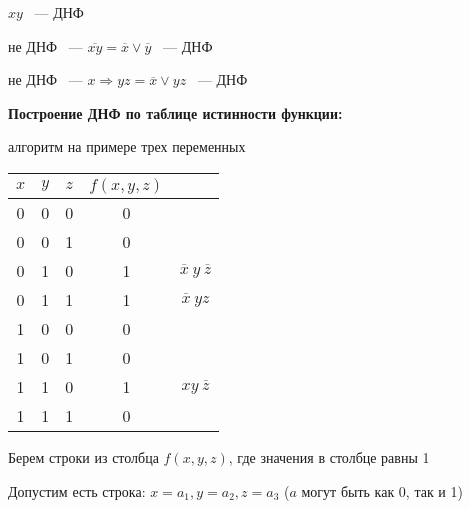 \documentclass[russian]{lecture-notes}
\begin{document}
\begin{sloppypar}
        \begin{example}
            $xy$ ~--- ДНФ
        \end{example}

        \begin{example}
            не ДНФ ~--- $\overline{xy} = \overline{x} \lor \overline{y}$ ~---  ДНФ
        \end{example}

        \begin{example}
            не ДНФ ~--- $x \Rightarrow yz = \overline{x} \lor yz$ ~---  ДНФ
        \end{example}

        \textbf{Построение ДНФ по таблице истинности функции:}

        алгоритм на примере трех переменных

        \begin{table}[h!]
            \centering
            \begin{tabular}{|c|c|c|c|c|}
                \hline
                $x$ & $y$ & $z$ & $f(x, y ,z)$ &                                     \\ \hline
                0     & 0   & 0   & 0            &                                     \\ \hline
                0     & 0   & 1   & 0            &                                     \\ \hline
                0     & 1   & 0   & 1            & $\overline{x} \: y \: \overline{z}$ \\ \hline
                0     & 1   & 1   & 1            & $\overline{x} \: yz$                \\ \hline
                1     & 0   & 0   & 0            &                                     \\ \hline
                1     & 0   & 1   & 0            &                                     \\ \hline
                1     & 1   & 0   & 1            & $xy \: \overline{z}$                \\ \hline
                1     & 1   & 1   & 0            &                                     \\ \hline
            \end{tabular}
        \end{table}

        Берем строки из столбца $f(x, y, z)$, где значения в столбце равны 1

        Допустим есть строка: $x = a_1, y = a_2, z = a_3$ ($a$ могут быть как 0, так и 1)


\end{sloppypar}
\end{document}
